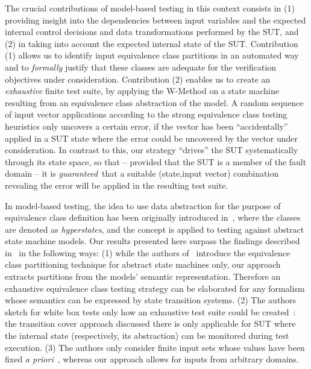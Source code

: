 The crucial contributions of model-based testing in this context consists in (1) providing insight into the dependencies between input variables and the expected internal control decisions and data transformations performed by the SUT, and (2) in taking into account the expected internal state of the SUT. Contribution (1) allows us to identify input equivalence class partitions in an automated way and to {\it formally} justify that these classes are adequate for the verification objectives under consideration. Contribution (2) enables us to create an {\it exhaustive} finite test suite, by applying the W-Method on a state machine resulting from an equivalence class abstraction of the  model. A random sequence of input vector applications according to the strong equivalence class testing heuristics only uncovers a certain error, if the vector has been ``accidentally'' applied in a SUT state where the error could be uncovered by the vector under consideration. In contrast to this, our strategy ``drives'' the SUT systematically through its state space, so that -- provided that the SUT is a member of the fault domain  -- it is 
{\it guaranteed}\ that a suitable (state,input vector) combination revealing the error will be applied in the resulting test suite.


In model-based testing, the idea to use data abstraction for the purpose of equivalence class definition has been originally introduced in~\cite{grieskamp2002}, where the classes are denoted as \emph{hyperstates}, and the concept is applied to testing against abstract state machine models. Our results presented here surpass the findings described in~\cite{grieskamp2002} in the following ways: (1) while the authors of~\cite{grieskamp2002} introduce the equivalence class partitioning technique for abstract state machines only, our approach extracts partitions from the models' semantic representation. Therefore an exhaustive equivalence class testing strategy can be elaborated for any formalism whose semantics can be expressed by state transition systems. (2) The authors sketch for white box tests only how an exhaustive test suite could be created~\cite[Section~4]{grieskamp2002}: the transition cover approach discussed there is only applicable for SUT where the internal state (respectively, its abstraction) can be monitored during test execution. (3)   The authors only consider finite input sets whose values have been  fixed \emph{a priori}~\cite[Section~2]{grieskamp2002}, whereas our approach allows for inputs from arbitrary domains. 



